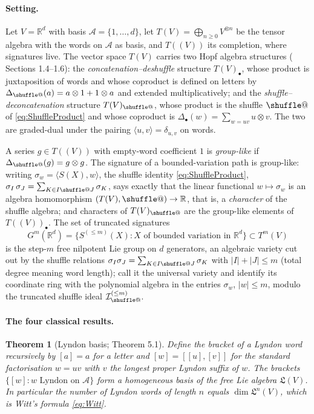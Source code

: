 \documentclass[11pt,english]{article}
\makeatletter
\providecommand*{\shuffle}{\mathbin{\mathpalette\shuffle@{}}}
\newcommand*{\shuffle@}[2]{%
  \sbox0{$#1\vcenter{}$}%
  \kern .15\ht0
  \rlap{\vrule height .25\ht0 depth 0pt width 2.5\ht0}%
  \raise.1\ht0\hbox to 2.5\ht0{%
    \vrule height 1.75\ht0 depth -.1\ht0 width .17\ht0
    \hfill
    \vrule height 1.75\ht0 depth -.1\ht0 width .17\ht0
    \hfill
    \vrule height 1.75\ht0 depth -.1\ht0 width .17\ht0}%
  \kern .15\ht0
}
\newtheorem{theorem}{Theorem}
\theoremstyle{definition}
\theoremstyle{remark}
\makeatother
\begin{document}
\paragraph{Setting.}
Let $V=\mathbb{R}^{d}$ with basis $\mathcal{A}=\{1,\ldots,d\}$, let
$T(V)=\bigoplus_{n\geq0}V^{\otimes n}$ be the tensor algebra with the
words on $\mathcal{A}$ as basis, and $T((V))$ its completion, where
signatures live. The vector space $T(V)$ carries two Hopf algebra
structures (\cite{Reutenauer} Sections 1.4--1.6): the
\emph{concatenation--deshuffle} structure $T(V)_{\bullet}$, whose
product is juxtaposition of words and whose coproduct is defined on
letters by $\Delta_{\shuffle}(a)=a\otimes1+1\otimes a$ and extended
multiplicatively; and the \emph{shuffle--deconcatenation} structure
$T(V)_{\shuffle}$, whose product is the shuffle $\shuffle$ of
\eqref{eq:ShuffleProduct} and whose coproduct is $\Delta_{\bullet}(w)=\sum_{w=uv}u\otimes v$.
The two are graded-dual under the pairing $\langle u,v\rangle=\delta_{u,v}$
on words.

A series $g\in T((V))$ with empty-word coefficient $1$ is
\emph{group-like} if $\Delta_{\shuffle}(g)=g\otimes g$. The signature
of a bounded-variation path is group-like: writing $\sigma_{w}=\langle S(X),w\rangle$,
the shuffle identity \eqref{eq:ShuffleProduct},
$\sigma_{I}\,\sigma_{J}=\sum_{K\in I\shuffle J}\sigma_{K}$, says
exactly that the linear functional $w\mapsto\sigma_{w}$ is an algebra
homomorphism $(T(V),\shuffle)\to\mathbb{R}$, that is, a
\emph{character} of the shuffle algebra; and characters of
$T(V)_{\shuffle}$ are the group-like elements of $T((V))_{\bullet}$.
The set of truncated signatures
\[
G^{m}(\mathbb{R}^{d})=\bigl\{S^{(\leq m)}(X):X\text{ of bounded variation in }\mathbb{R}^{d}\bigr\}\subset T^{m}(V)
\]
is the step-$m$ free nilpotent Lie group on $d$ generators, an
algebraic variety cut out by the shuffle relations
$\sigma_{I}\sigma_{J}=\sum_{K\in I\shuffle J}\sigma_{K}$ with
$|I|+|J|\leq m$ (total degree meaning word length); \cite{varieties}
call it the universal variety and identify
its coordinate ring with the polynomial algebra in the entries
$\sigma_{w}$, $|w|\leq m$, modulo the truncated shuffle ideal
$\mathcal{I}_{\shuffle}^{(\leq m)}$.

\paragraph{The four classical results.}

\begin{theorem}[Lyndon basis; \cite{Reutenauer} Theorem 5.1]
\label{thm:Lyndon-basis}
Define the bracket of a Lyndon word recursively by $[a]=a$ for a
letter and $[w]=[[u],[v]]$ for the standard factorisation $w=uv$ with
$v$ the longest proper Lyndon suffix of $w$. The brackets
$\{[w]:w\text{ Lyndon on }\mathcal{A}\}$ form a homogeneous basis of
the free Lie algebra $\mathfrak{L}(V)$. In particular the number of
Lyndon words of length $n$ equals $\dim\mathfrak{L}^{n}(V)$, which is
Witt's formula \eqref{eq:Witt}.
\end{theorem}
\end{document}
